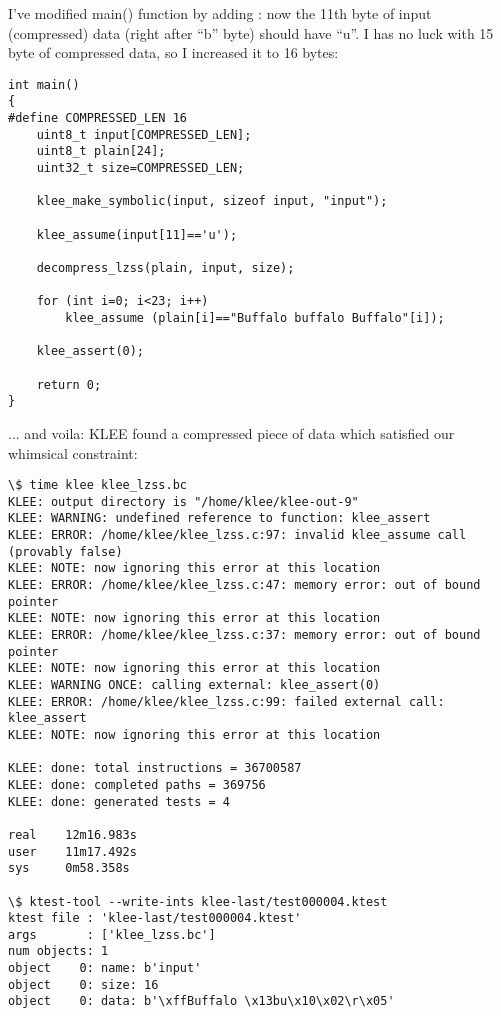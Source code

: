 I've modified main() function by adding : now the 11th byte of input (compressed) data (right after ``b'' byte) should have ``u''.
I has no luck with 15 byte of compressed data, so I increased it to 16 bytes:

\begin{lstlisting}
int main()
{
#define COMPRESSED_LEN 16
	uint8_t input[COMPRESSED_LEN];
	uint8_t plain[24];
	uint32_t size=COMPRESSED_LEN;
  
	klee_make_symbolic(input, sizeof input, "input");
	
	klee_assume(input[11]=='u');
	
	decompress_lzss(plain, input, size);

	for (int i=0; i<23; i++)
		klee_assume (plain[i]=="Buffalo buffalo Buffalo"[i]);

	klee_assert(0);
	
	return 0;
}
\end{lstlisting}

... and voila: KLEE found a compressed piece of data which satisfied our whimsical constraint:

\begin{lstlisting}
\$ time klee klee_lzss.bc
KLEE: output directory is "/home/klee/klee-out-9"
KLEE: WARNING: undefined reference to function: klee_assert
KLEE: ERROR: /home/klee/klee_lzss.c:97: invalid klee_assume call (provably false)
KLEE: NOTE: now ignoring this error at this location
KLEE: ERROR: /home/klee/klee_lzss.c:47: memory error: out of bound pointer
KLEE: NOTE: now ignoring this error at this location
KLEE: ERROR: /home/klee/klee_lzss.c:37: memory error: out of bound pointer
KLEE: NOTE: now ignoring this error at this location
KLEE: WARNING ONCE: calling external: klee_assert(0)
KLEE: ERROR: /home/klee/klee_lzss.c:99: failed external call: klee_assert
KLEE: NOTE: now ignoring this error at this location

KLEE: done: total instructions = 36700587
KLEE: done: completed paths = 369756
KLEE: done: generated tests = 4

real    12m16.983s
user    11m17.492s
sys     0m58.358s

\$ ktest-tool --write-ints klee-last/test000004.ktest
ktest file : 'klee-last/test000004.ktest'
args       : ['klee_lzss.bc']
num objects: 1
object    0: name: b'input'
object    0: size: 16
object    0: data: b'\xffBuffalo \x13bu\x10\x02\r\x05'
\end{lstlisting}

